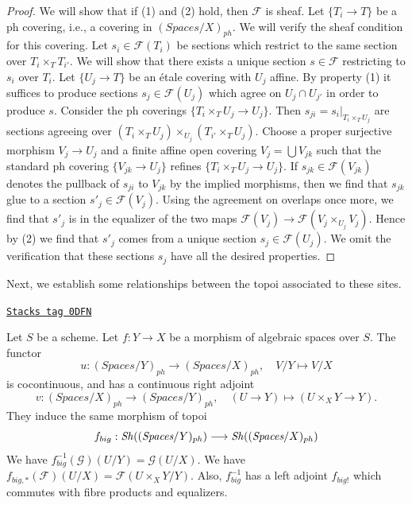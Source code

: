 \begin{proof}
We will show that if (1) and (2) hold, then $\mathcal{F}$ is sheaf.
Let $\{T_i \to T\}$ be a ph covering, i.e., a covering in
$(\textit{Spaces}/X)_{ph}$.
We will verify the sheaf condition for this covering.
Let $s_i \in \mathcal{F}(T_i)$ be sections which restrict to the same
section over $T_i \times_T T_{i'}$. We will show that there exists a
unique section $s \in \mathcal{F}$ restricting to $s_i$ over $T_i$.
Let $\{U_j \to T\}$ be an \'etale covering with $U_j$ affine.
By property (1) it suffices to produce sections $s_j \in \mathcal{F}(U_j)$
which agree on $U_j \cap U_{j'}$ in order to produce $s$.
Consider the ph coverings $\{T_i \times_T U_j \to U_j\}$.
Then $s_{ji} = s_i|_{T_i \times_T U_j}$ are sections agreeing
over $(T_i \times_T U_j) \times_{U_j} (T_{i'} \times_T U_j)$.
Choose a proper surjective morphism $V_j \to U_j$ and a finite affine
open covering $V_j = \bigcup V_{jk}$ such that the standard ph covering
$\{V_{jk} \to U_j\}$ refines $\{T_i \times_T U_j \to U_j\}$.
If $s_{jk} \in \mathcal{F}(V_{jk})$
denotes the pullback of $s_{ji}$ to $V_{jk}$ by the
implied morphisms, then we find that $s_{jk}$ glue to a section
$s'_j \in \mathcal{F}(V_j)$. Using the agreement on overlaps
once more, we find that $s'_j$ is in the equalizer of the two
maps $\mathcal{F}(V_j) \to \mathcal{F}(V_j \times_{U_j} V_j)$.
Hence by (2) we find that $s'_j$ comes from a unique section
$s_j \in \mathcal{F}(U_j)$. We omit the verification that these
sections $s_j$ have all the desired properties.
\end{proof}

Next, we establish some relationships between the topoi
associated to these sites.

\begin{lemma}
\label{spaces-topologies-lemma-morphism-big-ph}
\href{https://stacks.math.columbia.edu/tag/0DFN}{\texttt{Stacks tag 0DFN}}

Let $S$ be a scheme.
Let $f : Y \to X$ be a morphism of algebraic spaces over $S$.
The functor
$$
u : (\textit{Spaces}/Y)_{ph} \longrightarrow (\textit{Spaces}/X)_{ph},
\quad
V/Y \longmapsto V/X
$$
is cocontinuous, and has a continuous right adjoint
$$
v : (\textit{Spaces}/X)_{ph} \longrightarrow (\textit{Spaces}/Y)_{ph},
\quad
(U \to Y) \longmapsto (U \times_X Y \to Y).
$$
They induce the same morphism of topoi
$$
f_{big} :
\mathit{Sh}((\textit{Spaces}/Y)_{ph})
\longrightarrow
\mathit{Sh}((\textit{Spaces}/X)_{ph})
$$
We have $f_{big}^{-1}(\mathcal{G})(U/Y) = \mathcal{G}(U/X)$.
We have $f_{big, *}(\mathcal{F})(U/X) = \mathcal{F}(U \times_X Y/Y)$.
Also, $f_{big}^{-1}$ has a left adjoint $f_{big!}$ which commutes with
fibre products and equalizers.
\end{lemma}

